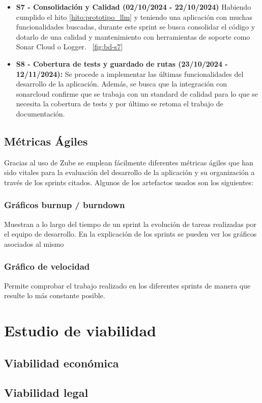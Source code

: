 \begin{itemize}
\item \textbf{S7 - Consolidación y Calidad (02/10/2024 - 22/10/2024)} Habiendo cumplido el hito \ref{hito:prototipo_llm} y teniendo una aplicación con muchas funcionalidades buscadas, durante este sprint se busca consolidar el código y dotarlo de una calidad y mantenimiento con herramientas de soporte como Sonar Cloud o Logger.
~\ref{fig:bd-s7}

\item \textbf{S8 - Cobertura de tests y guardado de rutas (23/10/2024 - 12/11/2024):} Se procede a implementar las últimas funcionalidades del desarrollo de la aplicación. Además, se busca que la integración con sonarcloud confirme que se trabaja con un standard de calidad para lo que se necesita la cobertura de tests y por último se retoma el trabajo de documentación. 

\end{itemize}

\subsection{Métricas Ágiles}
Gracias al uso de Zube se emplean fácilmente diferentes métricas ágiles que han sido vitales para la evaluación del desarrollo de la aplicación y su organización a través de los sprints citados. Algunos de los artefactos usados son los siguientes:
\subsubsection{Gráficos burnup / burndown} 
Muestran a lo largo del tiempo de un sprint la evolución de tareas realizadas por el equipo de desarrollo. En la explicación de los sprints se pueden ver los gráficos asociados al mismo
\subsubsection{Gráfico de velocidad} 
Permite comprobar el trabajo realizado en los diferentes sprints de manera que resulte lo más constante posible.


\section{Estudio de viabilidad}

\subsection{Viabilidad económica}

\subsection{Viabilidad legal}


